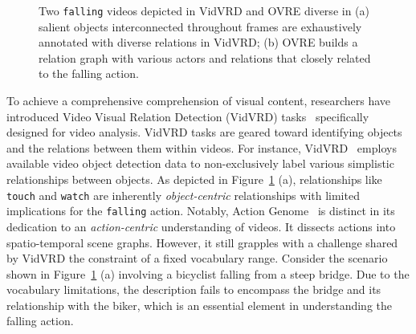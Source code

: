 \documentclass[letterpaper]{article}
\begin{document}
\begin{figure}
  \centering
  \caption{Two \texttt{falling} videos depicted in VidVRD and OVRE diverse in (a) salient objects interconnected throughout frames are exhaustively annotated with diverse relations in VidVRD; (b) OVRE builds a relation graph with various actors and relations that closely related to the falling action.
  }
  \label{fig:compare_anno}
\end{figure}

To achieve a comprehensive comprehension of visual content, researchers have introduced Video Visual Relation Detection (VidVRD) tasks~\cite{Shang2017VideoVR,shang2019annotating} specifically designed for video analysis. VidVRD tasks are geared toward identifying objects and the relations between them within videos.
For instance, VidVRD~\cite{Shang2017VideoVR} employs available video object detection data to non-exclusively label various simplistic relationships between objects. As depicted in Figure~\ref{fig:compare_anno} (a), relationships like \texttt{touch} and \texttt{watch} are inherently \emph{object-centric} relationships with limited implications for the \texttt{falling} action.
Notably, Action Genome~\cite{genome} is distinct in its dedication to an \emph{action-centric} understanding of videos. It dissects actions into spatio-temporal scene graphs. However, it still grapples with a challenge shared by VidVRD  the constraint of a fixed vocabulary range. Consider the scenario shown in Figure~\ref{fig:compare_anno} (a) involving a bicyclist falling from a steep bridge. Due to the vocabulary limitations, the description fails to encompass the bridge and its relationship with the biker, which is an essential element in understanding the falling action.
\end{document}
